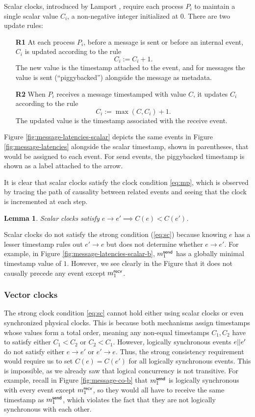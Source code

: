 \documentclass[]             %
{NASA}                       %
\newtheorem{lemma}[theorem]{Lemma}
\theoremstyle{definition}
\begin{document}
Scalar clocks, introduced by Lamport \cite{1978:lamportclocks},
require each process $P_i$ to maintain a single scalar value $C_i$, a
non-negative integer initialized at $0$. There are two update rules:
\begin{enumerate}
\item[\textbf{R1}] At each process $P_i$, before a message is sent or
  before an internal event, $C_i$ is updated according to the rule
  \[C_i := C_i + 1.\] The new value is the timestamp attached to the
  event, and for messages the value is sent (``piggybacked'')
  alongside the message as metadata.
\item[\textbf{R2}] When $P_i$ receives a message timestamped with value $C$, it
  updates $C_i$ according to the rule
  \[C_i := \max(C, C_i) + 1.\]
  The updated value is the timestamp associated with the receive
  event.
\end{enumerate}
Figure \ref{fig:message-latencies-scalar} depicts the same events in
Figure \ref{fig:message-latencies} alongside the scalar timestamp,
shown in parentheses, that would be assigned to each event. For send
events, the piggybacked timestamp is shown as a label attached to the
arrow.

It is clear that scalar clocks satisfy the clock condition
\eqref{eq:mp}, which is observed by tracing the path of causality
between related events and seeing that the clock is incremented at
each step.
\begin{lemma}
  Scalar clocks satisfy $e \to e' \implies C(e) < C(e')$.
\end{lemma}

Scalar clocks do not satisfy the strong condition (\ref{eq:sc})
because knowing $e$ has a lesser timestamp rules out $e' \to e$ but
does not determine whether $e \to e'$. For example, in Figure
\ref{fig:message-latencies-scalar-b}, $m_{1}^{\mathsf{send}}$ has a globally
minimal timestamp value of $1$. However, we see clearly in the Figure
that it does not causally precede any event except $m_{1}^{\mathsf{recv}}$.

\subsubsection{Vector clocks}
\newcommand{\vt}{\textrm{vt}}

The strong clock condition \eqref{eq:sc} cannot hold either using
scalar clocks or even synchronized physical clocks. This is because
both mechanisms assign timestamps whose values form a total order, meaning any
non-equal timestamps $C_1, C_2$ have to satisfy either $C_1 < C_2$ or
$C_2 < C_1$. However, logically synchronous events $e || e'$ do not
satisfy either $e \to e'$ or $e' \to e$. Thus, the strong consistency
requirement would require us to set $C(e) = C(e')$ for all logically
synchronous events. This is impossible, as we already saw that logical
concurrency is not transitive. For example, recall in Figure
\ref{fig:message-co-b} that $m_{1}^{\mathsf{send}}$ is logically
synchronous with every event except $m_{1}^{\mathsf{recv}}$, so they would
all have to receive the same timestamp as $m_{1}^{\mathsf{send}}$, which
violates the fact that they are not logically synchronous with each
other.
\end{document}

